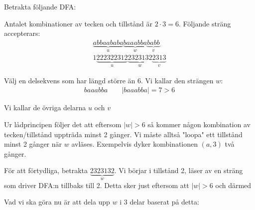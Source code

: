 \noindent Betrakta följande DFA:
\begin{figure}[ht!]
    \centering
    \caption{}
\end{figure}\par
\noindent Antalet kombinationer av tecken och tillstånd är $2\cdot 3=6$. Följande sträng accepterars:
\begin{equation*}
  \begin{gathered}
    \underbrace{abbaababa}_{\text{$u$}}\underbrace{baaabba}_{\text{$w$}}\underbrace{babb}_{\text{$v$}}\\
    1\underbrace{222322312}_{\text{$u$}}\underbrace{2323132}_{\text{$w$}}\underbrace{2313}_{\text{$v$}}
  \end{gathered}
\end{equation*}\par
\noindent Välj en delsekvens som har längd större än 6. Vi kallar den strängen $w$:
\begin{equation*}
  \begin{gathered}
    baaabba\qquad \left|baaabba\right| = 7>6
  \end{gathered}
\end{equation*}\par
\noindent Vi kallar de övriga delarna $u$ och $v$
\par\bigskip
\noindent Ur lådprincipen följer det att eftersom $\left|w\right|>6$ så kommer någon kombination av tecken/tillstånd uppträda minst 2 gånger. Vi måste alltså "loopa" ett tillstånd minst 2 gånger när $w$ avläses. Exempelvis dyker kombinationen $(a,3)$ två gånger. \par
\noindent För att förtydliga, betrakta $\underbrace{2323132}_{\text{$w$}}$. Vi börjar i tillstånd 2, läser av en sträng som driver DFA:n tillbaks till 2. Detta sker just eftersom att $\left|w\right|>6$ och därmed 
\par\bigskip
\noindent Vad vi ska göra nu är att dela upp $w$ i 3 delar baserat på detta:
